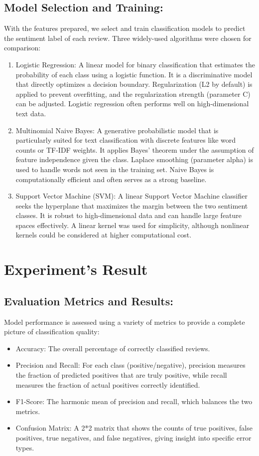 \documentclass{article}
\begin{document}
\subsection{Model Selection and Training:}
With the features prepared, we select and train classification models to predict the sentiment label of each review. Three widely-used algorithms were chosen for comparison:
\begin{enumerate}
\item Logistic Regression: A linear model for binary classification that estimates the probability of each class using a logistic function. It is a discriminative model that directly optimizes a decision boundary. Regularization (L2 by default) is applied to prevent overfitting, and the regularization strength (parameter C) can be adjusted. Logistic regression often performs well on high-dimensional text data.
\item Multinomial Naive Bayes: A generative probabilistic model that is particularly suited for text classification with discrete features like word counts or TF-IDF weights. It applies Bayes' theorem under the assumption of feature independence given the class. Laplace smoothing (parameter alpha) is used to handle words not seen in the training set. Naive Bayes is computationally efficient and often serves as a strong baseline.
\item Support Vector Machine (SVM): A linear Support Vector Machine classifier seeks the hyperplane that maximizes the margin between the two sentiment classes. It is robust to high-dimensional data and can handle large feature spaces effectively. A linear kernel was used for simplicity, although nonlinear kernels could be considered at higher computational cost.
\end{enumerate}

\section{Experiment's Result}
\subsection{Evaluation Metrics and Results:}
Model performance is assessed using a variety of metrics to provide a complete picture of classification quality:
\begin{itemize}
\item Accuracy: The overall percentage of correctly classified reviews.
\item Precision and Recall: For each class (positive/negative), precision measures the fraction of predicted positives that are truly positive, while recall measures the fraction of actual positives correctly identified.
\item F1-Score: The harmonic mean of precision and recall, which balances the two metrics.
\item Confusion Matrix: A 2*2 matrix that shows the counts of true positives, false positives, true negatives, and false negatives, giving insight into specific error types.
\end{itemize}
\end{document}
